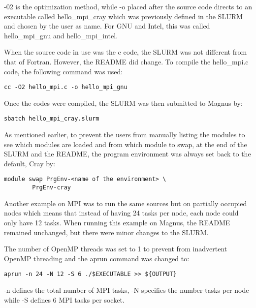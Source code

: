-02 is the optimization method, while -o placed after the source code directs to an executable called hello\_mpi\_cray which was previously defined in
the SLURM and chosen by the user as name. For GNU and Intel, this was called hello\_mpi\_gnu and hello\_mpi\_intel. 

When the source code in use was the c code, the SLURM was not different from that of Fortran. However, the README did change. 
To compile the hello\_mpi.c code, the following command was used: 

\begin{tcolorbox}
\begin{verbatim}
cc -O2 hello_mpi.c -o hello_mpi_gnu
\end{verbatim}
\end{tcolorbox}

Once the codes were compiled, the SLURM was then submitted to Magnus by:

\begin{tcolorbox}
\begin{verbatim}
sbatch hello_mpi_cray.slurm 
\end{verbatim}
\end{tcolorbox}

As mentioned earlier, to prevent the users from manually listing the modules to see which modules are loaded and from which module to swap, at the end
of the SLURM and the README, the program environment was always set back to the default, Cray by:

\begin{tcolorbox}
\begin{verbatim}
module swap PrgEnv-<name of the environment> \
		PrgEnv-cray
\end{verbatim}
\end{tcolorbox}

Another example on MPI was to run the same sources but on partially occupied nodes which means that instead of having 24 tasks per node, each node could
only have 12 tasks. When running this example on Magnus, the README remained unchanged, but there were minor changes to the SLURM.

The number of OpenMP threads was set to 1 to prevent from inadvertent OpenMP threading and the aprun command was changed to:

\begin{tcolorbox}
\begin{verbatim}
aprun -n 24 -N 12 -S 6 ./$EXECUTABLE >> ${OUTPUT}
\end{verbatim}
\end{tcolorbox}

-n defines the total number of MPI tasks, -N specifies the number tasks per node while -S defines 6 MPI tasks per socket.

